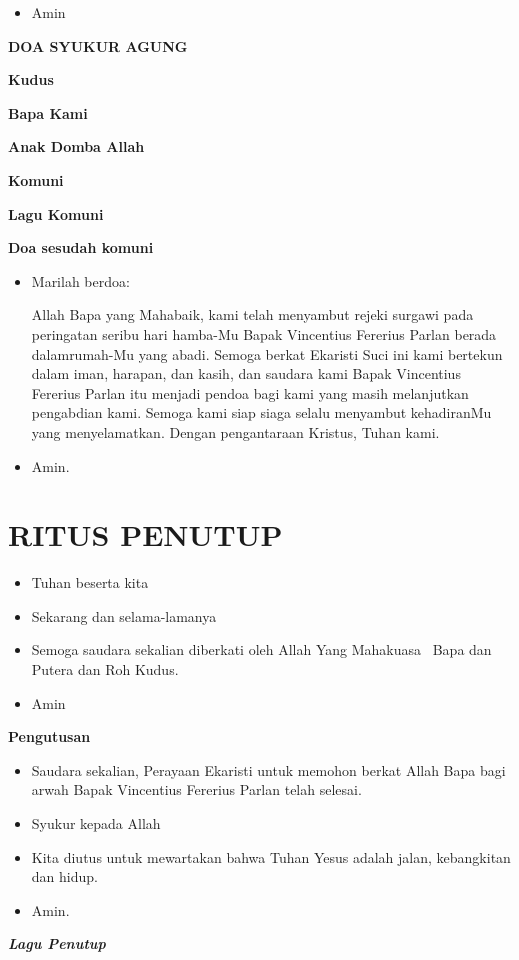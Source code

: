 \documentclass[titlepage,10pt,openany]{scrbook}
\makeatletter
\newcommand{\subjudul}[1]{%
  {\parindent \z@ 
    \interlinepenalty\@M \bfseries #1\par\nobreak \vskip 10\p@ }}
\newcommand{\lagu}[1]{%
  {\parindent \z@ 
    \interlinepenalty\@M \slshape \bfseries \normalsize \textit{#1}\par\nobreak \vskip 10\p@ }}
\newcommand{\BU}[1]{\begin{itemize} \item[U:] #1 \end{itemize}}
\newcommand{\BI}[1]{\begin{itemize} \item[I:] #1 \end{itemize}}
\newcommand{\namaalm}{Bapak Vincentius Fererius Parlan }
\makeatother
\begin{document}
\BU{Amin} 

\subjudul{DOA SYUKUR AGUNG}


\subjudul{Kudus}

\subjudul{Bapa Kami}

\subjudul{Anak Domba Allah}

\subjudul{Komuni}
\newpage
\subjudul{Lagu Komuni}
 

\subjudul{Doa sesudah komuni}

\BI{Marilah berdoa: 
	
	Allah Bapa yang Mahabaik, kami telah menyambut rejeki surgawi pada peringatan   seribu   hari   hamba-Mu  \namaalm   berada  dalamrumah-Mu yang abadi.  Semoga berkat Ekaristi Suci ini kami bertekun dalam iman, harapan, dan kasih, dan saudara kami \namaalm itu   menjadi   pendoa   bagi   kami   yang   masih   melanjutkan   pengabdian kami. Semoga  kami  siap  siaga  selalu  menyambut kehadiranMu  yang menyelamatkan. Dengan pengantaraan Kristus, Tuhan kami.}

\BU{Amin.}

 

\section*{RITUS PENUTUP}

\BI{Tuhan beserta kita}

\BU{Sekarang dan selama-lamanya}

\BI{Semoga saudara sekalian diberkati oleh Allah Yang 
Mahakuasa \Cross ~Bapa dan Putera dan Roh Kudus.}

\BU{Amin}

 

\subjudul{Pengutusan}

\BI{Saudara sekalian, Perayaan Ekaristi untuk memohon 
berkat Allah Bapa bagi arwah \namaalm telah selesai.}

\BU{Syukur kepada Allah}

\BI{Kita diutus untuk mewartakan bahwa Tuhan Yesus adalah 
jalan, kebangkitan dan hidup.}

\BU{Amin.}

 

\lagu{Lagu Penutup}

 
\end{document}
